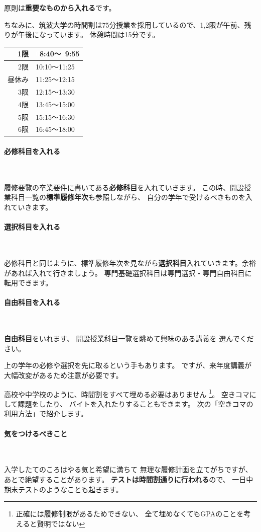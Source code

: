 \documentclass[a4j]{jsarticle}
\newcommand{\bold}[1]{{\bfseries #1}}
\newcommand{\parapara}[1]{\paragraph{#1}~\par}
\newcommand{\bparapara}[1]{\parapara{\bold{#1}}}
\begin{document}
原則は\bold{\large 重要なものから入れる}です。

\begin{multicols}{2}
ちなみに、筑波大学の時間割は75分授業を採用しているので、1,2限が午前、残りが午後になっています。
休憩時間は15分です。


\vspace{0mm}
\begin{table}[H]
\begin{center}
\begin{tabular}{|r|l|}
\hline 1限 & {\textcolor{white}0}8:40〜{\textcolor{white}0}9:55 \\ 
\hline 2限 & 10:10〜11:25 \\ 
\hline 昼休み & 11:25〜12:15 \\ 
\hline 3限 & 12:15〜13:30 \\ 
\hline 4限 & 13:45〜15:00 \\ 
\hline 5限 & 15:15〜16:30 \\ 
\hline 6限 & 16:45〜18:00 \\ 
\hline 
\end{tabular} 
\end{center}
\end{table}
\end{multicols}


\bparapara{必修科目を入れる}
履修要覧の卒業要件に書いてある\bold{必修科目}を入れていきます。
この時、開設授業科目一覧の\bold{標準履修年次}も参照しながら、
自分の学年で受けるべきものを入れていきます。

\newpage
\bparapara{選択科目を入れる}
必修科目と同じように、標準履修年次を見ながら\bold{選択科目}入れていきます。余裕があれば入れて行きましょう。
専門基礎選択科目は専門選択・専門自由科目に転用できます。

\bparapara{自由科目を入れる}
\bold{自由科目}をいれます、
開設授業科目一覧を眺めて興味のある講義を
選んでください。

上の学年の必修や選択を先に取るという手もあります。
ですが、来年度講義が大幅改変があるため注意が必要です。

高校や中学校のように、時間割をすべて埋める必要はありません
\footnote{正確には履修制限があるためできない、
全て埋めなくてもGPAのことを考えると賢明ではない}。
空きコマにして課題をしたり、
バイトを入れたりすることもできます。
次の「空きコマの利用方法」で紹介します。

\vspace{5mm}

\bparapara{気をつけるべきこと}
入学したてのころはやる気と希望に満ちて
無理な履修計画を立てがちですが、
あとで絶望することがあります。
\bold{テストは時間割通りに行われる}ので、
一日中期末テストのようなことも起きます。
\vspace{2mm}
\end{document}
